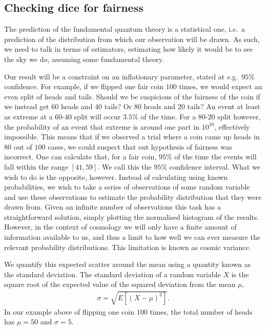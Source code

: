     \subsection{Checking dice for fairness}
    The prediction of the fundamental quantum theory is a statistical one,
    i.e.\ a prediction of the distribution from which our observation will be drawn.
    As such, we need to talk in terms of estimators, estimating how likely it
    would be to see the sky we do, assuming some fundamental theory.


    Our result will be a constraint on an inflationary parameter, stated at e.g.\ $95\%$ confidence.
    For example, if we flipped one fair coin $100$ times, we would expect an even split of heads
    and tails. Should we be suspicious of the fairness of the coin if we instead get $60$ heads
    and $40$ tails? Or $80$ heads and $20$ tails? An event at least as extreme at a $60$-$40$ split
    will occur $3.5\%$ of the time. For a $80$-$20$ split however, the probability of an event that
    extreme is around one part in $10^{10}$, effectively impossible. This means that if we observed
    a trial where a coin came up heads in $80$ out of $100$ cases, we could suspect that out hypothesis
    of fairness was incorrect.
    One can calculate that, for a fair coin, $95\%$ of the time the events will fall within the
    range $[41,59]$. We call this the $95\%$ confidence interval.
    What we wish to do is the opposite, however. Instead of calculating using known probabilities,
    we wish to take a series of observations of some random variable and use these observations
    to estimate the probability distribution that they were drawn from. Given an infinite number
    of observations this task has a straightforward solution, simply plotting the normalised
    histogram of the results. However, in the context of cosmology we will only have a finite amount
    of information available to us, and thus a limit to how well we can ever measure the relevant
    probability distributions. This limitation is known as cosmic variance.



    We quantify this expected scatter around the mean using a quantity known as the standard deviation.
    The standard deviation of a random variable $X$ is the square root of the expected value of the
    squared deviation from the mean $\mu$,
    \begin{align}
        \sigma = \sqrt{E\left[{(X-\mu)}^2\right]}.
    \end{align}
    In our example above of flipping one coin $100$ times, the total number of heads has $\mu=50$
    and $\sigma=5$.

